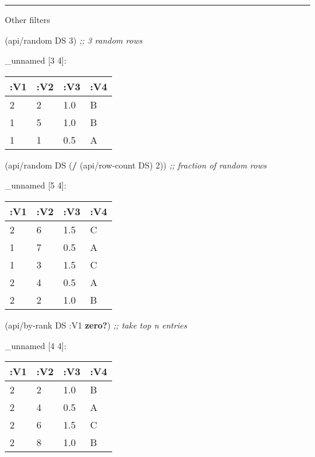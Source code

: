 \documentclass[]{article}
\newenvironment{Shaded}{\begin{snugshade}}{\end{snugshade}}
\newcommand{\AttributeTok}[1]{\textcolor[rgb]{0.77,0.63,0.00}{#1}}
\newcommand{\CommentTok}[1]{\textcolor[rgb]{0.56,0.35,0.01}{\textit{#1}}}
\newcommand{\DecValTok}[1]{\textcolor[rgb]{0.00,0.00,0.81}{#1}}
\newcommand{\KeywordTok}[1]{\textcolor[rgb]{0.13,0.29,0.53}{\textbf{#1}}}
\newcommand{\NormalTok}[1]{#1}
\begin{document}
\begin{center}\rule{0.5\linewidth}{0.5pt}\end{center}

Other filters

\begin{Shaded}
\begin{Highlighting}[]
\NormalTok{(api/random DS }\DecValTok{3}\NormalTok{) }\CommentTok{;; 3 random rows}
\end{Highlighting}
\end{Shaded}

\_unnamed {[}3 4{]}:

\begin{longtable}[]{@{}llll@{}}
\toprule
:V1 & :V2 & :V3 & :V4\tabularnewline
\midrule
\endhead
2 & 2 & 1.0 & B\tabularnewline
1 & 5 & 1.0 & B\tabularnewline
1 & 1 & 0.5 & A\tabularnewline
\bottomrule
\end{longtable}

\begin{Shaded}
\begin{Highlighting}[]
\NormalTok{(api/random DS (}\KeywordTok{/}\NormalTok{ (api/row-count DS) }\DecValTok{2}\NormalTok{)) }\CommentTok{;; fraction of random rows}
\end{Highlighting}
\end{Shaded}

\_unnamed {[}5 4{]}:

\begin{longtable}[]{@{}llll@{}}
\toprule
:V1 & :V2 & :V3 & :V4\tabularnewline
\midrule
\endhead
2 & 6 & 1.5 & C\tabularnewline
1 & 7 & 0.5 & A\tabularnewline
1 & 3 & 1.5 & C\tabularnewline
2 & 4 & 0.5 & A\tabularnewline
2 & 2 & 1.0 & B\tabularnewline
\bottomrule
\end{longtable}

\begin{Shaded}
\begin{Highlighting}[]
\NormalTok{(api/by-rank DS }\AttributeTok{:V1} \KeywordTok{zero?}\NormalTok{) }\CommentTok{;; take top n entries}
\end{Highlighting}
\end{Shaded}

\_unnamed {[}4 4{]}:

\begin{longtable}[]{@{}llll@{}}
\toprule
:V1 & :V2 & :V3 & :V4\tabularnewline
\midrule
\endhead
2 & 2 & 1.0 & B\tabularnewline
2 & 4 & 0.5 & A\tabularnewline
2 & 6 & 1.5 & C\tabularnewline
2 & 8 & 1.0 & B\tabularnewline
\bottomrule
\end{longtable}
\end{document}
